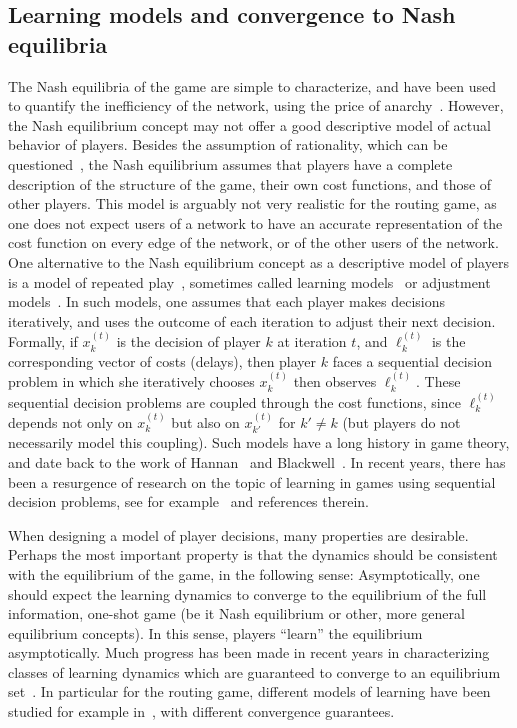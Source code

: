 \documentclass{sig-alternate-ipsn13}
\begin{document}
\subsection{Learning models and convergence to Nash equilibria}
The Nash equilibria of the game are simple to characterize, and have been used to quantify the inefficiency of the network, using the price of anarchy~\cite{roughgarden2007}. However, the Nash equilibrium concept may not offer a good descriptive model of actual behavior of players. Besides the assumption of rationality, which can be questioned~\cite{simon1955behavioral}, the Nash equilibrium assumes that players have a complete description of the structure of the game, their own cost functions, and those of other players. This model is arguably not very realistic for the routing game, as one does not expect users of a network to have an accurate representation of the cost function on every edge of the network, or of the other users of the network.
One alternative to the Nash equilibrium concept as a descriptive model of players is a model of repeated play~\cite{marden2013game,fox2013population}, sometimes called learning models~\cite{cesa2006prediction} or adjustment models~\cite{fudenberg1998theory}. In such models, one assumes that each player makes decisions iteratively, and uses the outcome of each iteration to adjust their next decision. Formally, if $x_k^{(t)}$ is the decision of player $k$ at iteration $t$, and $\ell^{(t)}_k$ is the corresponding vector of costs (delays), then player $k$ faces a sequential decision problem in which she iteratively chooses $x^{(t)}_k$ then observes $\ell_k^{(t)}$. These sequential decision problems are coupled through the cost functions, since $\ell_k^{(t)}$ depends not only on $x_k^{(t)}$ but also on $x_{k'}^{(t)}$ for $k' \neq k$ (but players do not necessarily model this coupling). Such models have a long history in game theory, and date back to the work of Hannan~\cite{hannan1957approximations} and Blackwell~\cite{blackwell1956analog}. In recent years, there has been a resurgence of research on the topic of learning in games using sequential decision problems, see for example~\cite{cesa2006prediction} and references therein.

When designing a model of player decisions, many properties are desirable. Perhaps the most important property is that the dynamics should be consistent with the equilibrium of the game, in the following sense: Asymptotically, one should expect the learning dynamics to converge to the equilibrium of the full information, one-shot game (be it Nash equilibrium or other, more general equilibrium concepts). In this sense, players ``learn'' the equilibrium asymptotically. Much progress has been made in recent years in characterizing classes of learning dynamics which are guaranteed to converge to an equilibrium set~\cite{freund1999adaptive, hart2001general, hart2005adaptive, fox2013population}. In particular for the routing game, different models of learning have been studied for example in~\cite{fischer2004evolution,blum2006routing,kleinberg2009multiplicative,krichene2015learning,krichene2015SMD}, with different convergence guarantees.
\end{document}
